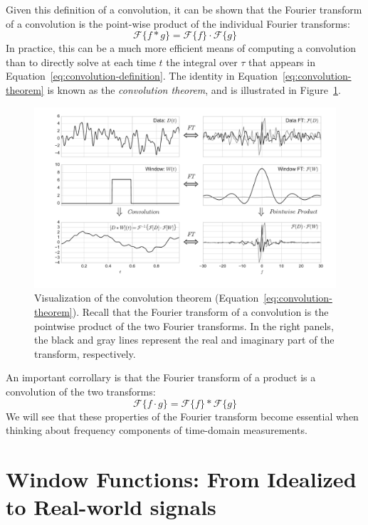 \documentclass[preprint]{aastex}
\newcommand{\fig}[1]{Figure~\ref{fig:#1}}
\newcommand{\figlabel}[1]{\label{fig:#1}}
\newcommand{\Eq}[1]{Equation~\ref{eq:#1}}
\newcommand{\eq}[1]{\Eq{#1}}
\newcommand{\eqlabel}[1]{\label{eq:#1}}
\newcommand{\sectlabel}[1]{\label{sect:#1}}
\begin{document}
Given this definition of a convolution, it can be shown that the Fourier transform of a convolution is the point-wise product of the individual
Fourier transforms:
\begin{equation}
  \mathcal{F}\{f \ast g\} = \mathcal{F}\{f\} \cdot \mathcal{F}\{g\}
  \eqlabel{convolution-theorem}
\end{equation}
In practice, this can be a much more efficient means of computing a convolution
than to directly solve at each time $t$ the integral over $\tau$ that appears
in \eq{convolution-definition}.
The identity in \eq{convolution-theorem} is known as the
{\it convolution theorem}, and is illustrated in \fig{convolution-theorem}.
\begin{figure}[ht]
  \centering
  \includegraphics[width=\textwidth]{fig05_Convolution_Theorem}
  \caption{Visualization of the convolution theorem (\eq{convolution-theorem}).
    Recall that the Fourier transform of
    a convolution is the pointwise product of the two Fourier transforms.
    In the right panels, the black and gray lines represent the real and
    imaginary part of the transform, respectively.
    \figlabel{convolution-theorem}}
\end{figure}
An important corrollary is that the Fourier transform of a product is a convolution of the two transforms:
\begin{equation}
  \mathcal{F}\{f \cdot g\} = \mathcal{F}\{f\} \ast \mathcal{F}\{g\}
  \eqlabel{convolution-theorem-inverse}
\end{equation}
We will see that these properties of the Fourier transform become essential
when thinking about frequency components of time-domain measurements.


\section{Window Functions: From Idealized to Real-world signals}
\sectlabel{window-functions}
\end{document}
